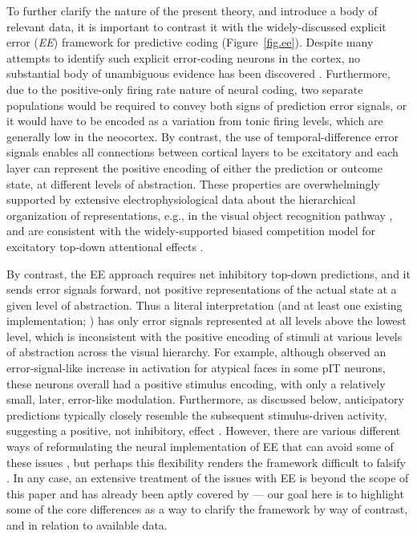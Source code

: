 \documentclass[11pt,twoside]{article}
\newif\myifpdf
\begin{document}
To further clarify the nature of the present theory, and introduce a body of relevant data, it is important to contrast it with the widely-discussed explicit error (\emph{EE}) framework for predictive coding \citep{RaoBallard99,KawatoHayakawaInui93,Friston05,Friston10,OudenKokLange12,BastosUsreyAdamsEtAl12,LotterKreimanCox16} (Figure~\ref{fig.ee}).  Despite many attempts to identify such explicit error-coding neurons in the cortex, no substantial body of unambiguous evidence has been discovered \citep{KokLange15,KokJeheedeLange12,SummerfieldEgner09,LeeMumford03,WalshMcGovernClarkEtAl20}.  Furthermore, due to the positive-only firing rate nature of neural coding, two separate populations would be required to convey both signs of prediction error signals, or it would have to be encoded as a variation from tonic firing levels, which are generally low in the neocortex.  By contrast, the use of temporal-difference error signals enables all connections between cortical layers to be excitatory and each layer can represent the positive encoding of either the prediction or outcome state, at different levels of abstraction.  These properties are overwhelmingly supported by extensive electrophysiological data about the hierarchical organization of representations, e.g., in the visual object recognition pathway \citep{KobatakeTanaka94,VanRullenThorpe02,CadieuHongYaminsEtAl14}, and are consistent with the widely-supported biased competition model for excitatory top-down attentional effects \citep{DesimoneDuncan95,ReynoldsChelazziDesimone99,MillerCohen01,OReillyWyatteHerdEtAl13}.

By contrast, the EE approach requires net inhibitory top-down predictions, and it sends error signals forward, not positive representations of the actual state at a given level of abstraction.  Thus a literal interpretation (and at least one existing implementation; \citealp{LotterKreimanCox16}) has only error signals represented at all levels above the lowest level, which is inconsistent with the positive encoding of stimuli at various levels of abstraction across the visual hierarchy.  For example, although \citet{IssaCadieuDiCarlo18} observed an error-signal-like increase in activation for atypical faces in some pIT neurons, these neurons overall had a positive stimulus encoding, with only a relatively small, later, error-like modulation.  Furthermore, as discussed below, anticipatory predictions typically closely resemble the subsequent stimulus-driven activity, suggesting a positive, not inhibitory, effect  \citep{DuhamelColbyGoldberg92,LeeMumford03,CavanaghHuntAfrazEtAl10,WalshMcGovernClarkEtAl20}.  However, there are various different ways of reformulating the neural implementation of EE that can avoid some of these issues \citep{Spratling08,BastosUsreyAdamsEtAl12}, but perhaps this flexibility renders the framework difficult to falsify \citep{KogoTrengove15}.  In any case, an extensive treatment of the issues with EE is beyond the scope of this paper and has already been aptly covered by \citet{WalshMcGovernClarkEtAl20} --- our goal here is to highlight some of the core differences as a way to clarify the framework by way of contrast, and in relation to available data.
\end{document}
